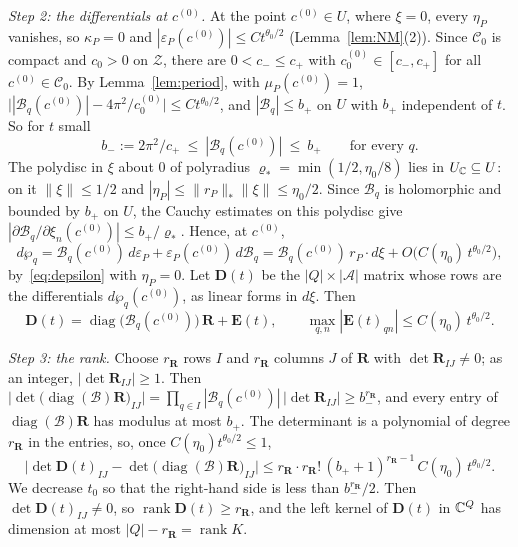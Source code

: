 \emph{Step 2: the differentials at $c^{(0)}$.} At the point $c^{(0)}\in U$, where $\xi=0$, every $\eta_P$ vanishes, so
$\kappa_P=0$ and $|\varepsilon_P(c^{(0)})|\le Ct^{\theta_0/2}$ (Lemma~\ref{lem:NM}(2)). Since $\mathscr C_0$ is compact
and $c_0>0$ on $\mathcal Z$, there are $0<c_-\le c_+$ with $c^{(0)}_0\in[c_-,c_+]$ for all $c^{(0)}\in\mathscr C_0$. By
Lemma~\ref{lem:period}, with $\mu_P(c^{(0)})=1$, $\bigl||\mathcal B_q(c^{(0)})|-4\pi^2/c^{(0)}_0\bigr|\le Ct^{\theta_0/2}$, and
$|\mathcal B_q|\le b_+$ on $U$ with $b_+$ independent of $t$. So for $t$ small
\[
b_-:=2\pi^2/c_+\ \le\ |\mathcal B_q(c^{(0)})|\ \le\ b_+\qquad\text{for every }q .
\]
The polydisc in $\xi$ about $0$ of polyradius $\varrho_*=\min(1/2,\eta_0/8)$ lies in $U_\mathbb C\subseteq U$: on it
$\|\xi\|\le1/2$ and $|\eta_P|\le\|r_P\|_*\|\xi\|\le\eta_0/2$. Since $\mathcal B_q$ is holomorphic and bounded by $b_+$ on $U$,
the Cauchy estimates on this polydisc give $|\partial\mathcal B_q/\partial\xi_n(c^{(0)})|\le b_+/\varrho_*$. Hence, at $c^{(0)}$,
\[
d\wp_q=\mathcal B_q(c^{(0)})\,d\varepsilon_P+\varepsilon_P(c^{(0)})\,d\mathcal B_q
=\mathcal B_q(c^{(0)})\,r_P\cdot d\xi+O\bigl(C(\eta_0)\,t^{\theta_0/2}\bigr),
\]
by~\eqref{eq:depsilon} with $\eta_P=0$. Let $\mathbf D(t)$ be the $|Q|\times|\mathcal A|$ matrix whose rows are the
differentials $d\wp_q(c^{(0)})$, as linear forms in $d\xi$. Then
\begin{equation}\label{eq:Dmatrix}
\mathbf D(t)=\operatorname{diag}\bigl(\mathcal B_q(c^{(0)})\bigr)\,\mathbf R+\mathbf E(t),\qquad
\max_{q,n}|\mathbf E(t)_{qn}|\le C(\eta_0)\,t^{\theta_0/2}.
\end{equation}

\emph{Step 3: the rank.} Choose $r_{\mathbf R}$ rows $I$ and $r_{\mathbf R}$ columns $J$ of $\mathbf R$ with $\det\mathbf R_{IJ}\neq0$; as an integer,
$|\det\mathbf R_{IJ}|\ge1$. Then $\bigl|\det\bigl(\operatorname{diag}(\mathcal B)\mathbf R\bigr)_{IJ}\bigr|=\prod_{q\in I}|\mathcal B_q(c^{(0)})|\,
|\det\mathbf R_{IJ}|\ge b_-^{r_{\mathbf R}}$, and every entry of $\operatorname{diag}(\mathcal B)\mathbf R$ has modulus at most $b_+$. The determinant
is a polynomial of degree $r_{\mathbf R}$ in the entries, so, once $C(\eta_0)t^{\theta_0/2}\le1$,
\[
\bigl|\det\mathbf D(t)_{IJ}-\det\bigl(\operatorname{diag}(\mathcal B)\mathbf R\bigr)_{IJ}\bigr|
\le r_{\mathbf R}\cdot r_{\mathbf R}!\,(b_++1)^{r_{\mathbf R}-1}\,C(\eta_0)\,t^{\theta_0/2}.
\]
We decrease $t_0$ so that the right-hand side is less than $b_-^{r_{\mathbf R}}/2$. Then $\det\mathbf D(t)_{IJ}\neq0$, so
$\operatorname{rank}\mathbf D(t)\ge r_{\mathbf R}$, and the left kernel of $\mathbf D(t)$ in $\mathbb C^Q$ has dimension at most
$|Q|-r_{\mathbf R}=\operatorname{rank}K$.

